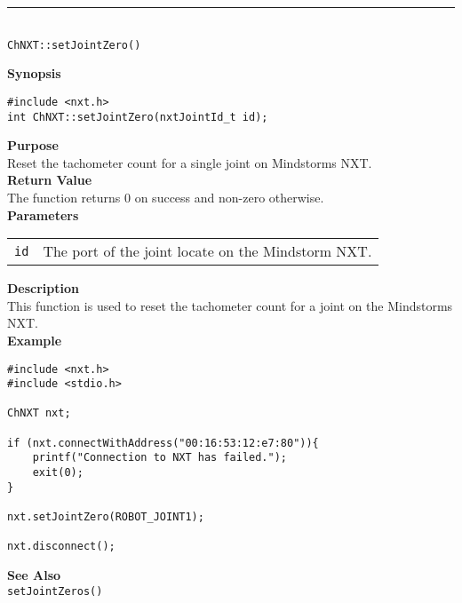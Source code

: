 \noindent
\vspace{5pt}
\rule{4.5in}{0.015in}\\
\noindent
{\LARGE \texttt{ChNXT::setJointZero()} }\\


\noindent
{\bf Synopsis}
\vspace{-8pt}
\begin{verbatim}
#include <nxt.h>
int ChNXT::setJointZero(nxtJointId_t id);
\end{verbatim}

\noindent
{\bf Purpose}\\
Reset the tachometer count for a single joint on Mindstorms NXT.\\

\noindent
{\bf Return Value}\\
The function returns 0 on success and non-zero otherwise.\\

\noindent
{\bf Parameters}\\
\vspace{-0.1in}
\begin{description}
\item
\begin{tabular}{p{20mm}p{135mm}}
\texttt{id} &The port of the joint locate on the Mindstorm NXT.\\
\end{tabular}
\end{description}

\noindent
{\bf Description}\\
This function is used to reset the tachometer count for a joint on the Mindstorms NXT.\\

\noindent
{\bf Example}
\begin{verbatim}
#include <nxt.h> 
#include <stdio.h>

ChNXT nxt;

if (nxt.connectWithAddress("00:16:53:12:e7:80")){
    printf("Connection to NXT has failed.");
    exit(0);
}
    
nxt.setJointZero(ROBOT_JOINT1);

nxt.disconnect();
\end{verbatim}

\noindent
{\bf See Also}\\
\texttt{setJointZeros()}\\
